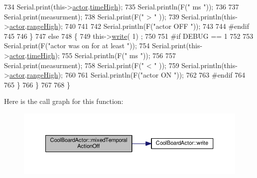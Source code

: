 \begin{DoxyCode}
734             Serial.print(this->\hyperlink{class_cool_board_actor_a8f190db9f7a39fddbcef7f152da970e9}{actor}.\hyperlink{struct_cool_board_actor_1_1state_a54cd4976b56aeaa6274fe0576aaebb0f}{timeHigh});
735             Serial.println(F(\textcolor{stringliteral}{" ms "}));
736 
737             Serial.print(measurment);
738             Serial.print(F(\textcolor{stringliteral}{" > "} ));
739             Serial.println(this->\hyperlink{class_cool_board_actor_a8f190db9f7a39fddbcef7f152da970e9}{actor}.\hyperlink{struct_cool_board_actor_1_1state_a6e5cd6c5cd44e2decfd8d4df1853f8e3}{rangeHigh});
740 
741             
742             Serial.println(F(\textcolor{stringliteral}{"actor OFF "}));
743 
744 \textcolor{preprocessor}{        #endif}
745 
746         \}
747         \textcolor{keywordflow}{else} 
748         \{
749             this->\hyperlink{class_cool_board_actor_a958786ff01ea1056ee72c72d439f86da}{write}( 1) ;
750 
751 \textcolor{preprocessor}{        #if DEBUG == 1 }
752             
753             Serial.print(F(\textcolor{stringliteral}{"actor was on for at least "}));
754             Serial.print(this->\hyperlink{class_cool_board_actor_a8f190db9f7a39fddbcef7f152da970e9}{actor}.\hyperlink{struct_cool_board_actor_1_1state_a54cd4976b56aeaa6274fe0576aaebb0f}{timeHigh});
755             Serial.println(F(\textcolor{stringliteral}{" ms "}));
756 
757             Serial.print(measurment);
758             Serial.print(F(\textcolor{stringliteral}{" < "} ));
759             Serial.println(this->\hyperlink{class_cool_board_actor_a8f190db9f7a39fddbcef7f152da970e9}{actor}.\hyperlink{struct_cool_board_actor_1_1state_a6e5cd6c5cd44e2decfd8d4df1853f8e3}{rangeHigh});
760 
761             Serial.println(F(\textcolor{stringliteral}{"actor ON "}));
762 
763 \textcolor{preprocessor}{        #endif              }
764 
765         \}           
766     \}
767 
768 \}
\end{DoxyCode}
Here is the call graph for this function\+:\nopagebreak
\begin{figure}[H]
\begin{center}
\leavevmode
\includegraphics[width=350pt]{dc/d69/class_cool_board_actor_a00b29c4abf0388551aa6812372113cf1_cgraph}
\end{center}
\end{figure}
